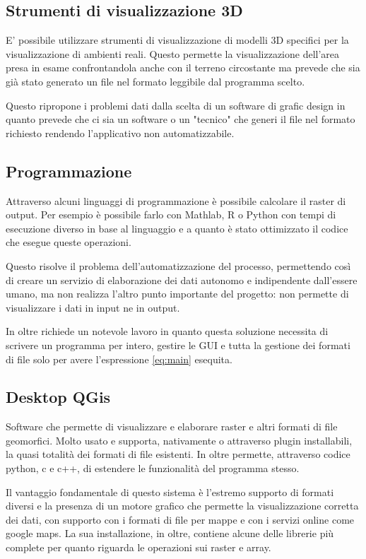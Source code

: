 \subsection{Strumenti di visualizzazione 3D}
E' possibile utilizzare strumenti di visualizzazione di modelli 3D specifici per la visualizzazione di ambienti reali. Questo permette la visualizzazione dell'area presa in esame confrontandola anche con il terreno circostante ma prevede che sia già stato generato un file nel formato leggibile dal programma scelto.

Questo ripropone i problemi dati dalla scelta di un software di grafic design in quanto prevede che ci sia un software o un "tecnico" che generi il file nel formato richiesto rendendo l'applicativo non automatizzabile.

\subsection{Programmazione}
Attraverso alcuni linguaggi di programmazione è possibile calcolare il raster di output. Per esempio è possibile farlo con Mathlab, R o Python con tempi di esecuzione diverso in base al linguaggio e a quanto è stato ottimizzato il codice che esegue queste operazioni. 

Questo risolve il problema dell'automatizzazione del processo, permettendo così di creare un servizio di elaborazione dei dati autonomo e indipendente dall'essere umano, ma non realizza l'altro punto importante del progetto: non permette di visualizzare i dati in input ne in output.

In oltre richiede un notevole lavoro in quanto questa soluzione necessita di scrivere un programma per intero, gestire le GUI e tutta la gestione dei formati di file solo per avere l'espressione \ref{eq:main} esequita.

\subsection{Desktop QGis}

Software che permette di visualizzare e elaborare raster e altri formati di file geomorfici. Molto usato e supporta, nativamente o attraverso plugin installabili, la quasi totalità dei formati di file esistenti. In oltre permette, attraverso codice python, c e c++, di estendere le funzionalità del programma stesso.

Il vantaggio fondamentale di questo sistema è l'estremo supporto di formati diversi e la presenza di un motore grafico che permette la visualizzazione corretta dei dati, con supporto con i formati di file per mappe e con i servizi online come google maps. La sua installazione, in oltre, contiene alcune delle librerie più complete per quanto riguarda le operazioni sui raster e array.

